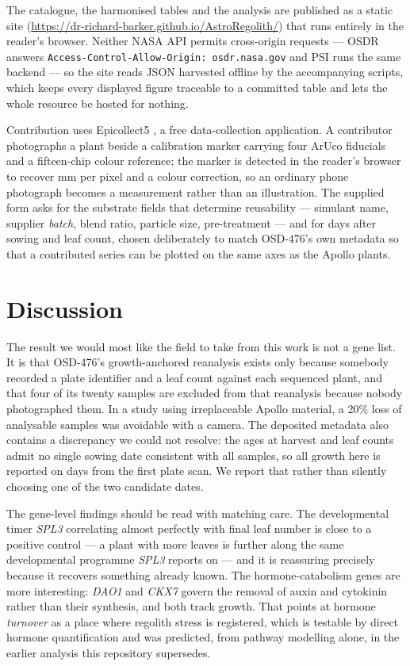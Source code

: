 \documentclass[11pt,a4paper]{article}
\begin{document}
The catalogue, the harmonised tables and the analysis are published as a static site
(\url{https://dr-richard-barker.github.io/AstroRegolith/}) that runs entirely in the
reader's browser. Neither NASA API permits cross-origin requests --- OSDR answers
\texttt{Access-Control-Allow-Origin: osdr.nasa.gov} and PSI runs the same backend ---
so the site reads JSON harvested offline by the accompanying scripts, which keeps every
displayed figure traceable to a committed table and lets the whole resource be hosted
for nothing.

Contribution uses Epicollect5 \citep{aanensen2014epicollect}, a free data-collection
application. A contributor photographs a plant beside a calibration marker carrying four
ArUco fiducials and a fifteen-chip colour reference; the marker is detected in the
reader's browser to recover \si{\milli\metre} per pixel and a colour correction, so an
ordinary phone photograph becomes a measurement rather than an illustration. The
supplied form asks for the substrate fields that determine reusability --- simulant
name, supplier \emph{batch}, blend ratio, particle size, pre-treatment --- and for days
after sowing and leaf count, chosen deliberately to match OSD-476's own metadata so that
a contributed series can be plotted on the same axes as the Apollo plants.

\section{Discussion}

The result we would most like the field to take from this work is not a gene list. It is
that OSD-476's growth-anchored reanalysis exists only because somebody recorded a plate
identifier and a leaf count against each sequenced plant, and that four of its twenty
samples are excluded from that reanalysis because nobody photographed them. In a study
using irreplaceable Apollo material, a 20\% loss of analysable samples was avoidable
with a camera. The deposited metadata also contains a discrepancy we could not resolve:
the ages at harvest and leaf counts admit no single sowing date consistent with all
samples, so all growth here is reported on days from the first plate scan. We report
that rather than silently choosing one of the two candidate dates.

The gene-level findings should be read with matching care. The developmental timer
\textit{SPL3} correlating almost perfectly with final leaf number is close to a positive
control --- a plant with more leaves is further along the same developmental programme
\textit{SPL3} reports on --- and it is reassuring precisely because it recovers something
already known. The hormone-catabolism genes are more interesting: \textit{DAO1} and
\textit{CKX7} govern the removal of auxin and cytokinin rather than their synthesis, and
both track growth. That points at hormone \emph{turnover} as a place where regolith
stress is registered, which is testable by direct hormone quantification and was
predicted, from pathway modelling alone, in the earlier analysis this repository
supersedes.
\end{document}
